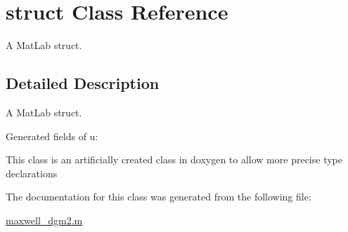 \hypertarget{classstruct}{\section{struct Class Reference}
\label{classstruct}
}


A Mat\-Lab struct.  




\subsection{Detailed Description}
A Mat\-Lab struct. 

\begin{DoxyParagraph}{Generated fields of u\-:}

\end{DoxyParagraph}
This class is an artificially created class in doxygen to allow more precise type declarations 

The documentation for this class was generated from the following file\-:\begin{DoxyCompactItemize}
\item 
\hyperlink{maxwell__dgm2_8m}{maxwell\-\_\-dgm2.\-m}\end{DoxyCompactItemize}
